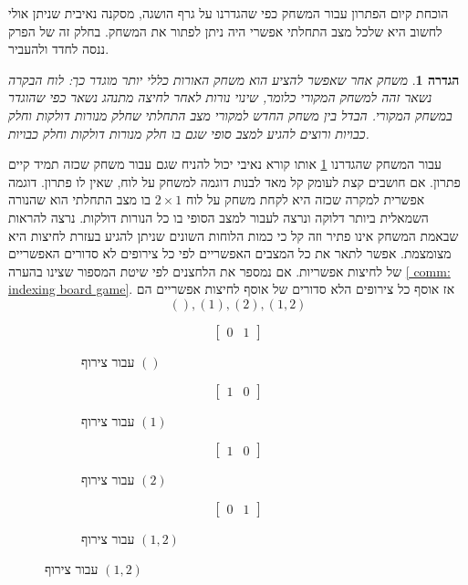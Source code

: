 \documentclass[12pt,leqno]{article}
\theoremstyle{theoremdd}
\newtheorem{definition}{הגדרה}[section]
\begin{document}
הוכחת קיום הפתרון עבור המשחק כפי שהגדרנו  על גרף הושגה, מסקנה נאיבית שניתן אולי לחשוב היא שלכל מצב התחלתי
אפשרי היה ניתן לפתור את המשחק. בחלק זה של הפרק ננסה לחדד ולהעביר.
\begin{definition}
    \label{def:diff-game}
    משחק אחר שאפשר להציע הוא משחק האורות כללי יותר מוגדר כך:
    לוח הבקרה נשאר זהה למשחק המקורי כלומר, שינוי נורות 
    לאחר לחיצה מתנהג נשאר כפי שהוגדר במשחק המקורי.
    הבדל בין משחק החדש למקורי 
    מצב התחלתי שחלק מנורות דולקות וחלק כבויות ורוצים להגיע למצב סופי שגם בו חלק מנורות דולקות וחלק כבויות.
\end{definition}
עבור המשחק שהגדרנו 
\ref{def:diff-game}
אותו קורא נאיבי יכול להניח שגם עבור משחק שכזה תמיד קיים פתרון.
אם חושבים קצת לעומק קל מאד לבנות דוגמה למשחק על לוח, שאין לו פתרון.
דוגמה אפשרית למקרה שכזה היא לקחת משחק על לוח 
$2 \times 1$
בו מצב התחלתי הוא שהנורה השמאלית ביותר דלוקה ונרצה לעבור למצב הסופי בו כל 
הנורות דולקות.
נרצה להראות שבאמת המשחק אינו פתיר וזה קל כי כמות 
הלוחות השונים שניתן להגיע בעזרת לחיצות היא מצומצמת.
אפשר לתאר את כל המצבים האפשריים לפי 
כל צירופים לא סדורים האפשריים של לחיצות אפשריות.
אם נמספר את הלחצנים לפי שיטת המספור שצינו בהערה 
\ref{ comm: indexing board game}.
אז אוסף כל צירופים הלא סדורים 
של אוסף לחיצות אפשריים הם 
\[
    (), (1), (2), (1,2)
\]
\begin{figure}[ht]
    \caption{מצבי הלוחות לאחר לחיצה של צירוף}
    \centering
    \begin{subfigure}{.20\textwidth}
        \caption{
            עבור צירוף
            $()$
        }
        \[
            \begin{bmatrix}
                0 & 1
            \end{bmatrix}
        \]
    \end{subfigure}
    \begin{subfigure}{.20\textwidth}
        \caption{
            עבור צירוף
            $(1)$
        }
        \[
            \begin{bmatrix}
                1 & 0
            \end{bmatrix}
        \]
    \end{subfigure}
    \begin{subfigure}{.20\textwidth}
        \caption{
            עבור צירוף
            $(2)$
        }
        \[
            \begin{bmatrix}
                1 & 0
            \end{bmatrix}
        \]
    \end{subfigure}
    \begin{subfigure}{.20\textwidth}
        \caption{
            עבור צירוף
            $(1, 2)$
        }
        \[
            \begin{bmatrix}
                0 & 1
            \end{bmatrix}
        \]
    \end{subfigure}%
\end{figure}
\end{document}
